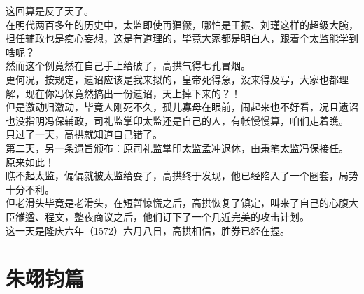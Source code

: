 \begin{multicols}{\theparacolNo}
这回算是反了天了。\\

在明代两百多年的历史中，太监即使再猖獗，哪怕是王振、刘瑾这样的超级大腕，担任辅政也是痴心妄想，这是有道理的，毕竟大家都是明白人，跟着个太监能学到啥呢？\\

然而这个例竟然在自己手上给破了，高拱气得七孔冒烟。\\

更何况，按规定，遗诏应该是我来拟的，皇帝死得急，没来得及写，大家也都理解，现在你冯保竟然搞出一份遗诏，天上掉下来的？！\\

但是激动归激动，毕竟人刚死不久，孤儿寡母在眼前，闹起来也不好看，况且遗诏也没指明冯保辅政，司礼监掌印太监还是自己的人，有帐慢慢算，咱们走着瞧。\\

只过了一天，高拱就知道自己错了。\\

第二天，另一条遗旨颁布：原司礼监掌印太监孟冲退休，由秉笔太监冯保接任。\\

原来如此！\\

瞧不起太监，偏偏就被太监给耍了，高拱终于发现，他已经陷入了一个圈套，局势十分不利。\\

但老滑头毕竟是老滑头，在短暂惊慌之后，高拱恢复了镇定，叫来了自己的心腹大臣雒遒、程文，整夜商议之后，他们订下了一个几近完美的攻击计划。\\

这一天是隆庆六年（1572）六月八日，高拱相信，胜券已经在握。\\
\ifnum{}
	\end{multicols}
\fi
\newpage

\chapter*{朱翊钧篇}
